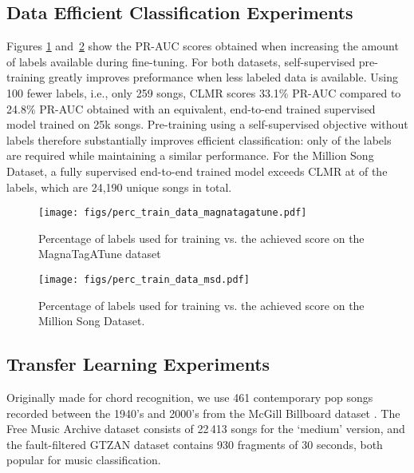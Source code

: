 \documentclass{article}
\begin{document}
\subsection{Data Efficient Classification Experiments}
Figures \ref{fig:perc_train_data_magnatagatune} and~\ref{fig:perc_train_data_msd} show the PR-AUC scores obtained when increasing the amount of labels available during fine-tuning.
For both datasets, self-supervised pre-training greatly improves preformance when less labeled data is available.
Using 100 fewer labels, i.e., only 259 songs, CLMR scores 33.1\% PR-AUC compared to 24.8\% PR-AUC obtained with an equivalent, end-to-end trained supervised model trained on 25k songs.
Pre-training using a self-supervised objective without labels therefore substantially improves efficient classification: only  of the labels are required while maintaining a similar performance.
For the Million Song Dataset, a fully supervised end-to-end trained model exceeds CLMR at  of the labels, which are 24,190 unique songs in total.

\begin{figure}[t]
    \centering
    \texttt{[image: figs/perc\_train\_data\_magnatagatune.pdf]}
    \caption{Percentage of labels used for training vs.
the achieved  score on the Magna\-Tag\-A\-Tune dataset}
    \label{fig:perc_train_data_magnatagatune}
\end{figure}

\begin{figure}[t]
    \centering
    \texttt{[image: figs/perc\_train\_data\_msd.pdf]}
    \caption{Percentage of labels used for training vs.
the achieved  score on the Million Song Dataset.}
    \label{fig:perc_train_data_msd}
\end{figure}


\subsection{Transfer Learning Experiments}
Originally made for chord recognition, we use 461 contemporary pop songs recorded between the 1940's and 2000's from the McGill Billboard dataset \cite{burgoyne_billboard}.
The Free Music Archive dataset \cite{fma_dataset} consists of 22\,413 songs for the `medium' version, and the fault-filtered GTZAN dataset \cite{tzanetakis2002musical,sturm2013gtzan} contains 930 fragments of 30 seconds, both popular for music classification.
\end{document}
